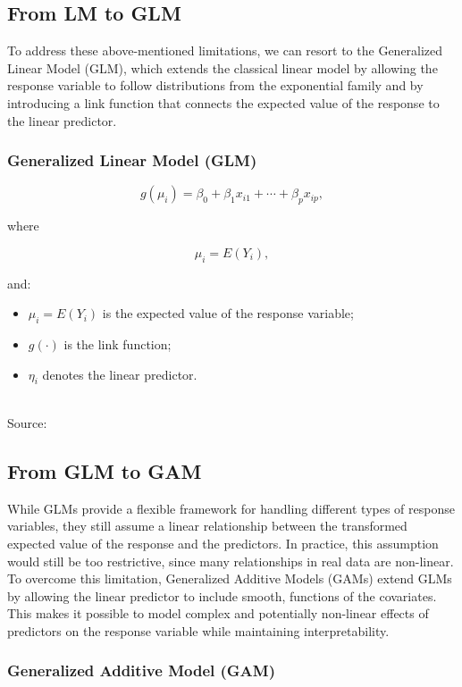 \subsection{From LM to GLM}
To address these above-mentioned limitations, we can resort to 
the Generalized Linear Model (GLM), which extends the classical
linear model by allowing the response variable to follow 
distributions from the exponential family and by introducing a 
link function that connects the expected value of the response 
to the linear predictor.
\subsubsection{Generalized Linear Model (GLM)}

\begin{equation}
g(\mu_i)=
\beta_0+\beta_1x_{i1}+\cdots+\beta_px_{ip},
\end{equation}

where

\begin{equation}
\mu_i=E(Y_i),
\end{equation}

and:
\begin{itemize}
    \item $\mu_i=E(Y_i)$ is the expected value of the response variable;
    \item $g(\cdot)$ is the link function;
    \item $\eta_i$ denotes the linear predictor.
\end{itemize}\\
\small Source: \textcite[p.~109]{gelman2007book}

\subsection{From GLM to GAM}
While GLMs provide a flexible framework for handling different
types of response variables, they still assume a linear 
relationship between the transformed expected value of the
response and the predictors. In practice, this assumption would
still be too restrictive, since many relationships in real 
data are non-linear.\\
To overcome this limitation, Generalized Additive Models (GAMs) 
extend GLMs by allowing the linear predictor to include smooth, 
functions of the covariates. This makes it possible to model 
complex and potentially non-linear effects of predictors on the 
response variable while maintaining interpretability.
\subsubsection{Generalized Additive Model (GAM)}

